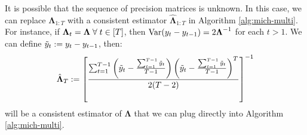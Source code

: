 It is possible that the sequence of precision matrices is unknown. In this case, we can replace $\boldsymbol{\Lambda}_{1:T}$ with a consistent estimator $\hat{\boldsymbol{\Lambda}}_{1:T}$ in Algorithm \ref{alg:mich-multi}. For instance, if $\boldsymbol{\Lambda}_t = \boldsymbol{\Lambda} \;\forall\; t \in [T]$, then $\text{\normalfont Var}(y_t - y_{t-1}) = 2\boldsymbol{\Lambda}^{-1}$ for each $t > 1$. We can define $\Tilde{y}_t := y_t - y_{t-1}$, then:
\begin{align*}
    \hat{\boldsymbol{\Lambda}}_T := \left[\frac{\sum_{t=1}^{T-1} \left(\Tilde{y}_t - \frac{\sum_{t=1}^{T-1}\Tilde{y}_t}{T-1}\right)\left(\Tilde{y}_t - \frac{\sum_{t=1}^{T-1}\Tilde{y}_t}{T-1}\right)^T}{2(T-2)}\right]^{-1}
\end{align*}
will be a consistent estimator of $\boldsymbol{\Lambda}$ that we can plug directly into Algorithm \ref{alg:mich-multi}. 